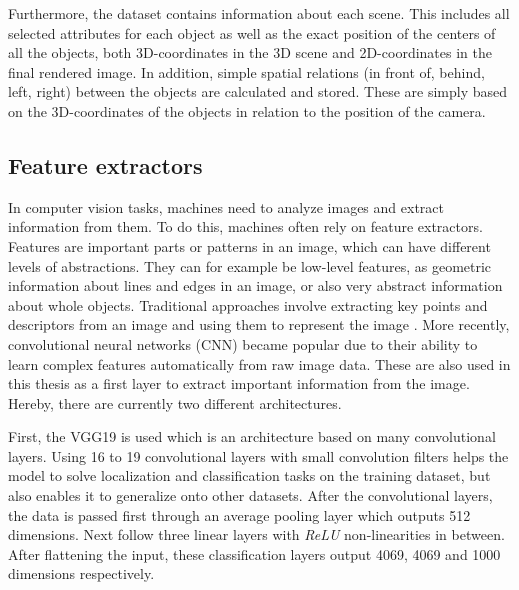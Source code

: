 Furthermore, the dataset contains information about each scene.
This includes all selected attributes for each object as well as the exact position of the centers of all the objects, both 3D-coordinates in the 3D scene and 2D-coordinates in the final rendered image.
In addition, simple spatial relations (in front of, behind, left, right) between the objects are calculated and stored.
These are simply based on the 3D-coordinates of the objects in relation to the position of the camera.

\subsection{Feature extractors}
\label{sec:feature-extractors}
In computer vision tasks, machines need to analyze images and extract information from them.
To do this, machines often rely on feature extractors.
Features are important parts or patterns in an image, which can have different levels of abstractions.
They can for example be low-level features, as geometric information about lines and edges in an image, or also very abstract information about whole objects.
Traditional approaches involve extracting key points and descriptors from an image and using them to represent the image \citep{Harris1988,Lowe1999,Bay2006}.
More recently, convolutional neural networks (CNN) became popular due to their ability to learn complex features automatically from raw image data.
These are also used in this thesis as a first layer to extract important information from the image. Hereby, there are currently two different architectures.

First, the VGG19 \citep{Simonyan2015} is used which is an architecture based on many convolutional layers.
Using 16 to 19 convolutional layers with small convolution filters helps the model to solve localization and classification tasks on the training dataset, but also enables it to generalize onto other datasets.
After the convolutional layers, the data is passed first through an average pooling layer which outputs 512 dimensions.
Next follow three linear layers with \emph{ReLU} non-linearities in between.
After flattening the input, these classification layers output 4069, 4069 and 1000 dimensions respectively.

